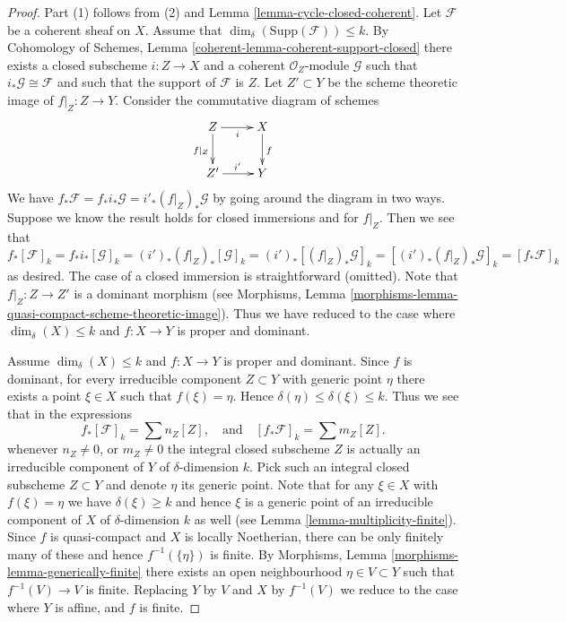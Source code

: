 \documentclass[10pt,a4paper]{amsart}
\theoremstyle{plain}
\theoremstyle{definition}
\theoremstyle{remark}
\numberwithin{equation}{subsection}
\begin{document}
\begin{proof}
Part (1) follows from (2) and Lemma \ref{lemma-cycle-closed-coherent}.
Let $\mathcal{F}$ be a coherent sheaf on $X$.
Assume that $\dim_\delta(\text{Supp}(\mathcal{F})) \leq k$.
By Cohomology of Schemes, Lemma \ref{coherent-lemma-coherent-support-closed}
there exists a closed subscheme $i : Z \to X$ and a coherent
$\mathcal{O}_Z$-module $\mathcal{G}$ such that
$i_*\mathcal{G} \cong \mathcal{F}$ and such that the support
of $\mathcal{F}$ is $Z$. Let $Z' \subset Y$ be the scheme theoretic image
of $f|_Z : Z \to Y$. Consider the commutative diagram of schemes
$$
\xymatrix{
Z \ar[r]_i \ar[d]_{f|_Z} &
X \ar[d]^f \\
Z' \ar[r]^{i'} & Y
}
$$
We have $f_*\mathcal{F} = f_*i_*\mathcal{G} = i'_*(f|_Z)_*\mathcal{G}$
by going around the diagram in two ways. Suppose we know the result holds
for closed immersions and for $f|_Z$. Then we see that
$$
f_*[\mathcal{F}]_k = f_*i_*[\mathcal{G}]_k
= (i')_*(f|_Z)_*[\mathcal{G}]_k =
(i')_*[(f|_Z)_*\mathcal{G}]_k =
[(i')_*(f|_Z)_*\mathcal{G}]_k = [f_*\mathcal{F}]_k
$$
as desired. The case of a closed immersion is straightforward (omitted).
Note that $f|_Z : Z \to Z'$ is a dominant morphism (see
Morphisms, Lemma \ref{morphisms-lemma-quasi-compact-scheme-theoretic-image}).
Thus we have reduced to the case where
$\dim_\delta(X) \leq k$ and $f : X \to Y$ is proper and dominant.

\medskip\noindent
Assume $\dim_\delta(X) \leq k$ and $f : X \to Y$ is proper and dominant.
Since $f$ is dominant, for every irreducible component $Z \subset Y$
with generic point $\eta$ there exists a point $\xi \in X$ such
that $f(\xi) = \eta$. Hence $\delta(\eta) \leq \delta(\xi) \leq k$.
Thus we see that in the expressions
$$
f_*[\mathcal{F}]_k = \sum n_Z[Z],
\quad
\text{and}
\quad
[f_*\mathcal{F}]_k = \sum m_Z[Z].
$$
whenever $n_Z \not = 0$, or $m_Z \not = 0$ the integral closed
subscheme $Z$ is actually an irreducible component of $Y$ of
$\delta$-dimension $k$. Pick such an integral closed subscheme
$Z \subset Y$ and denote $\eta$ its generic point. Note that for
any $\xi \in X$ with $f(\xi) = \eta$ we have $\delta(\xi) \geq k$
and hence $\xi$ is a generic point of an irreducible component
of $X$ of $\delta$-dimension $k$ as well
(see Lemma \ref{lemma-multiplicity-finite}). Since $f$ is quasi-compact
and $X$ is locally Noetherian, there can be only finitely many of
these and hence $f^{-1}(\{\eta\})$ is finite.
By Morphisms, Lemma \ref{morphisms-lemma-generically-finite} there exists
an open neighbourhood $\eta \in V \subset Y$ such that $f^{-1}(V) \to V$
is finite. Replacing $Y$ by $V$ and $X$ by $f^{-1}(V)$ we reduce to the
case where $Y$ is affine, and $f$ is finite.


\end{proof}
\end{document}
